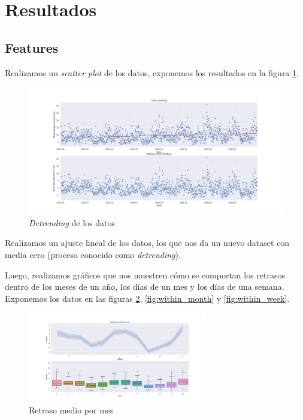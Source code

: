 \section{Resultados}\label{sec:resultados}

\subsection{Features}\label{subsec:features}

Realizamos un \textit{scatter plot} de los datos, exponemos los resultados en la figura \ref{fig:trending}.

\begin{figure}[hbtp]
  \centering
  \includegraphics[width=\textwidth]{plots/linear_trending.png}
  \caption{\textit{Detrending} de los datos}
  \label{fig:trending}
\end{figure}

Realizamos un ajuste lineal de los datos, los que nos da un nuevo dataset con media cero (proceso conocido
como \textit{detrending}).

Luego, realizamos gr\'aficos que nos muestren c\'omo se comportan los retrasos dentro de los meses de un a\~no, los
d\'ias de un mes y los d\'ias de una semana. Exponemos los datos en las figuras \ref{fig:within_year}, \ref{fig:within_month}
y \ref{fig:within_week}.

\begin{figure}[hbtp]
  \centering
  \includegraphics[width=0.7\textwidth]{plots/within_year.png}
  \caption{Retraso medio por mes}
  \label{fig:within_year}
\end{figure}

